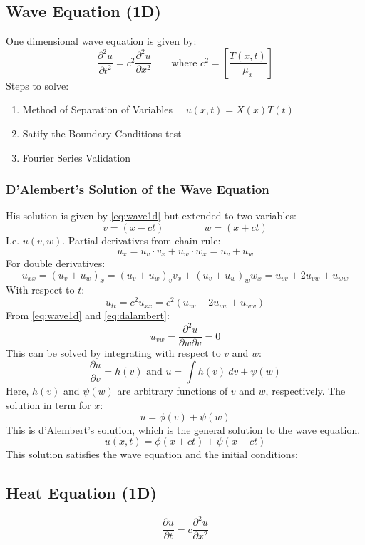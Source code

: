 \subsection{Wave Equation (1D)}
One dimensional wave equation is given by:
\begin{equation}
  \frac{\partial^2 u}{\partial t^2} = c^2 \frac{\partial^2 u}{\partial x^2}\quad\quad\text{where }c^2=\left[\frac{T(x,t)}{\mu_x}\right]
  \label{eq:wave1d}
\end{equation}
Steps to solve:
\begin{enumerate}
  \item Method of Separation of Variables $\quad u(x,t)=X(x)T(t)$
  \item Satify the Boundary Conditions test
  \item Fourier Series Validation

\end{enumerate}
\subsubsection{D’Alembert’s Solution of the Wave Equation}
His solution is given by \cref{eq:wave1d} but extended to two variables:
\begin{equation}
  v=(x-ct) \quad\quad\quad\quad w=(x+ct)
  \label{eq:dalambert}
\end{equation}
I.e. $u(v,w)$. Partial derivatives from chain rule:
\[
  u_x=u_v \cdot v_x+u_w\cdot w_x=u_v+u_w
\]
For double derivatives:
\[
  u_{xx}=(u_v+u_w)_x=(u_v+u_w)_v v_x+(u_v+u_w)_w w_x=u_{vv}+2u_{vw}+u_{ww}
\]
With respect to $t$:
\[
  u_{tt}=c^2u_{xx}=c^2(u_{vv}+2u_{vw}+u_{ww})
\]
From \cref{eq:wave1d} and \cref{eq:dalambert}:
\[
  u_{vw}=\frac{\partial^2u}{\partial w \partial v}=0
\]
This can be solved by integrating with respect to $v$ and $w$:
\[
  \frac{\partial u}{\partial v}=h(v) \text{ and } u=\int h(v)\ dv + \psi(w)
\]
Here, $h(v)$ and $\psi(w)$ are arbitrary functions of $v$ and $w$, respectively.
The solution in term for $x$:
\[
  u=\phi(v)+\psi(w)
\]
This is d'Alembert's solution, which is the general solution to the wave equation.
\[
  u(x,t)=\phi(x+ct)+\psi(x-ct)
\]
This solution satisfies the wave equation and the initial conditions:




\subsection{Heat Equation (1D)}
\begin{equation}
  \frac{\partial u}{\partial t}=c\frac{\partial^2 u}{\partial x^2}
  \label{eq:Heat1D}
\end{equation}

